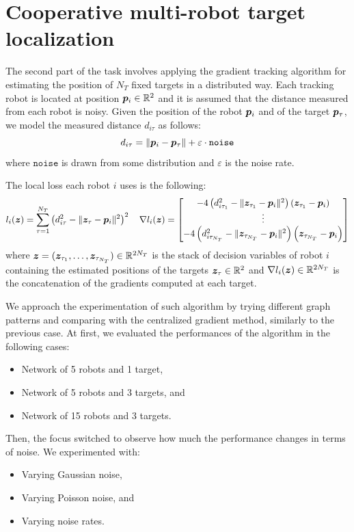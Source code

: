\documentclass[a4paper,11pt,oneside]{book}
\begin{document}
\section{Cooperative multi-robot target localization}

The second part of the task involves applying the gradient tracking algorithm for estimating the position of $N_T$ fixed targets in a distributed way. Each tracking robot is located at position ${\bm{p}}_i \in {\mathbb{R}}^2$ and it is assumed that the distance measured from each robot is noisy. Given the position of the robot ${\bm{p}}_i$ and of the target ${\bm{p}}_\tau$, we model the measured distance $d_{i\tau}$ as follows:
\[
      d_{i\tau} = \Vert {\bm{p}}_i - {\bm{p}}_\tau \Vert + \varepsilon \cdot \texttt{noise}
\]
where $\texttt{noise}$ is drawn from some distribution and $\varepsilon$ is the noise rate.

The local loss each robot $i$ uses is the following:
\[
      l_i({\bm{z}}) = \sum_{\tau=1}^{N_T} \left( d_{i\tau}^2 - \Vert {\bm{z}}_{\tau} - {\bm{p}}_i \Vert^2 \right)^2
      \quad
      \nabla l_i({\bm{z}}) = \begin{bmatrix}
            -4 \left( d_{i\tau_{1}}^2 - \Vert {\bm{z}}_{\tau_{1}} - {\bm{p}}_i \Vert^2 \right) \left( {\bm{z}}_{\tau_{1}} - {\bm{p}}_i \right) \\
            \vdots \\
            -4 \left( d_{i\tau_{N_T}}^2 - \Vert {\bm{z}}_{\tau_{N_T}} - {\bm{p}}_i \Vert^2 \right) \left( {\bm{z}}_{\tau_{N_T}} - {\bm{p}}_i \right) \\
      \end{bmatrix}
\]
where ${\bm{z}} = ({\bm{z}}_{\tau_1}, \dots, {\bm{z}}_{\tau_{N_T}}) \in {\mathbb{R}}^{2N_T}$ is the stack of decision variables of robot $i$ containing the estimated positions of the targets ${\bm{z}}_{\tau} \in {\mathbb{R}}^2$ and $\nabla l_i({\bm{z}}) \in {\mathbb{R}}^{2N_T}$ is the concatenation of the gradients computed at each target.

We approach the experimentation of such algorithm by trying different graph patterns and comparing with the centralized gradient method, similarly to the previous case. At first, we evaluated the performances of the algorithm in the following cases:
\begin{itemize}
      \item Network of 5 robots and 1 target,
      \item Network of 5 robots and 3 targets, and
      \item Network of 15 robots and 3 targets.
\end{itemize}

Then, the focus switched to observe how much the performance changes in terms of noise. We experimented with:
\begin{itemize}
      \item Varying Gaussian noise,
      \item Varying Poisson noise, and
      \item Varying noise rates.
\end{itemize}
\end{document}
